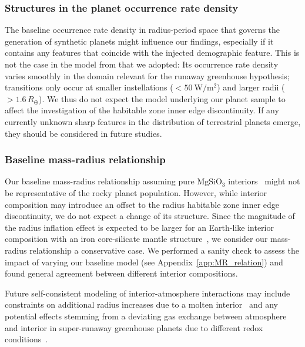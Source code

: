 \documentclass[twocolumn,twocolappendix]{aastex631}
\begin{document}
\subsubsection{Structures in the planet occurrence rate density}
The baseline occurrence rate density in radius-period space that governs the generation of synthetic planets might influence our findings, especially if it contains any features that coincide with the injected demographic feature.
This is not the case in the model from \citet{Bergsten2022} that we adopted: Its occurrence rate density varies smoothly in the domain relevant for the runaway greenhouse hypothesis; transitions only occur at smaller instellations ($< \SI{50}{\watt\per\meter\squared}$) and larger radii ($> 1.6\,R_\oplus$).
We thus do not expect the model underlying our planet sample to affect the investigation of the habitable zone inner edge discontinuity.
If any currently unknown sharp features in the distribution of terrestrial planets emerge, they should be considered in future studies.

\subsubsection{Baseline mass-radius relationship}
Our baseline mass-radius relationship assuming pure $\mathrm{MgSiO_3}$ interiors~\citep{Zeng2016} might not be representative of the rocky planet population.
However, while interior composition may introduce an offset to the radius habitable zone inner edge discontinuity, we do not expect a change of its structure.
Since the magnitude of the radius inflation effect is expected to be larger for an Earth-like interior composition with an iron core-silicate mantle structure~\citep{Zeng2016,Noack2020,2021JGRE..12606724B}, we consider our mass-radius relationship a conservative case.
We performed a sanity check to assess the impact of varying our baseline model (see Appendix~\ref{app:MR_relation}) and found general agreement between different interior compositions.

Future self-consistent modeling of interior-atmosphere interactions may include constraints on additional radius increases due to a molten interior~\citep{Bower2019} and any potential effects stemming from a deviating gas exchange between atmosphere and interior in super-runaway greenhouse planets due to different redox conditions~\citep{Ikoma2018,Lichtenberg2021c,2022PSJ.....3...93B,2021SSRv..217...22G}.
\end{document}
